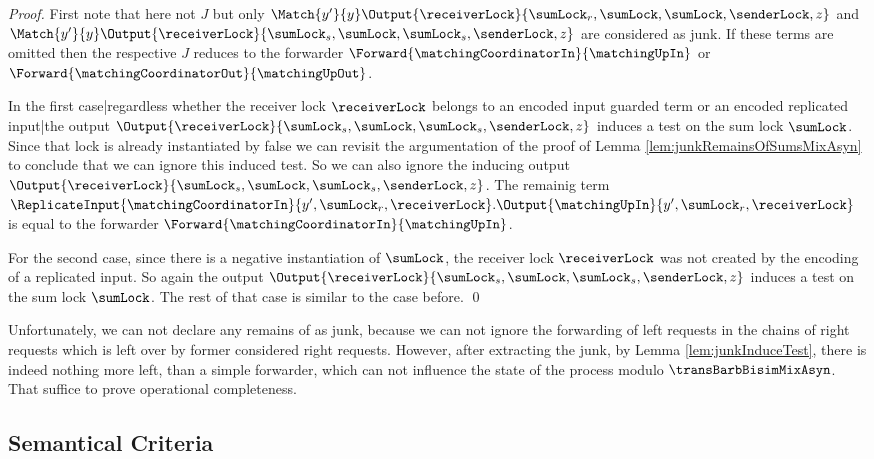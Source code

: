 \documentclass[]{llncs}
\begin{document}
\begin{proof}
	First note that here not $ J $ but only $ \Match{y'}{y}\Output{\receiverLock}{\sumLock_r, \sumLock, \sumLock, \senderLock, z} $ and $ \Match{y'}{y}\Output{\receiverLock}{\sumLock_s, \sumLock, \sumLock_s, \senderLock, z} $ are considered as junk. If these terms are omitted then the respective $ J $ reduces to the forwarder $ \Forward{\matchingCoordinatorIn}{\matchingUpIn} $ or $ \Forward{\matchingCoordinatorOut}{\matchingUpOut} $.
	
	In the first case|regardless whether the receiver lock $ \receiverLock $ belongs to an encoded input guarded term or an encoded replicated input|the output $ \Output{\receiverLock}{\sumLock_s, \sumLock, \sumLock_s, \senderLock, z} $ induces a test on the sum lock $ \sumLock $. Since that lock is already instantiated by false we can revisit the argumentation of the proof of Lemma \ref{lem:junkRemainsOfSumsMixAsyn} to conclude that we can ignore this induced test. So we can also ignore the inducing output $ \Output{\receiverLock}{\sumLock_s, \sumLock, \sumLock_s, \senderLock, z} $. The remainig term $ \ReplicateInput{\matchingCoordinatorIn}{y', \sumLock_r, \receiverLock}. \Output{\matchingUpIn}{y', \sumLock_r, \receiverLock} $ is equal to the forwarder $ \Forward{\matchingCoordinatorIn}{\matchingUpIn} $.
	
	For the second case, since there is a negative instantiation of $ \sumLock $, the receiver lock $ \receiverLock $ was not created by the encoding of a replicated input. So again the output $ \Output{\receiverLock}{\sumLock_s, \sumLock, \sumLock_s, \senderLock, z} $ induces a test on the sum lock $ \sumLock $. The rest of that case is similar to the case before.
	\qed
\end{proof}

Unfortunately, we can not declare any remains of \simulations as junk, because we can not ignore the forwarding of left requests in the chains of right requests which is left over by former considered right requests. However, after extracting the junk, by Lemma \ref{lem:junkInduceTest}, there is indeed nothing more left, than a simple forwarder, which can not influence the state of the process modulo $ \transBarbBisimMixAsyn $. That suffice to prove operational completeness.

\subsection{Semantical Criteria}
\end{document}

